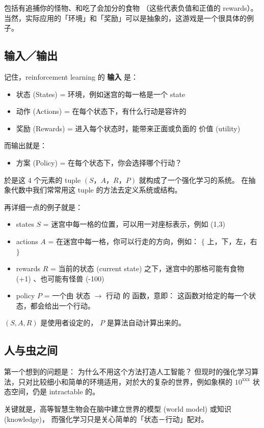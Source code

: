 \documentclass[orivec]{llncs}
\newcommand{\emp}[1]{\textbf{\textcolor{Cerulean}{#1}}}
\begin{document}
包括有追捕你的怪物、和吃了会加分的食物 （这些代表负值和正值的 rewards）。  当然，实际应用的「环境」和「奖励」可以是抽象的，这游戏是一个很具体的例子。

\subsection{输入／输出}

记住，reinforcement learning 的 \emp{输入} 是：
\let\labelitemi\labelitemii
\begin{itemize}
\item 状态 (States) = 环境，例如迷宫的每一格是一个 state
\item 动作 (Actions) = 在每个状态下，有什么行动是容许的
\item 奖励 (Rewards) = 进入每个状态时，能带来正面或负面的 价值 (utility)
\end{itemize}
而输出就是：
\begin{itemize}
\item 方案 (Policy) = 在每个状态下，你会选择哪个行动？
\end{itemize}
於是这 4 个元素的 tuple $(S，A，R，P)$ 就构成了一个强化学习的系统。   在抽象代数中我们常常用这 tuple 的方法去定义系统或结构。

再详细一点的例子就是：
\begin{itemize}
\item states $S$ = 迷宫中每一格的位置，可以用一对座标表示，例如 (1,3)
\item actions $A$ = 在迷宫中每一格，你可以行走的方向，例如： $\{$ 上，下，左，右 $\}$
\item rewards $R$ = 当前的状态 (current state) 之下，迷宫中的那格可能有食物 (+1) 、也可能有怪兽 (-100)
\item policy $P$ = 一个由 状态 $\rightarrow$ 行动 的 函数，意即： 这函数对给定的每一个状态，都会给出一个行动。 
\end{itemize}
$(S, A, R)$ 是使用者设定的， $P$ 是算法自动计算出来的。  

\subsection{人与虫之间}

第一个想到的问题是： 为什么不用这个方法打造人工智能？  但现时的强化学习算法，只对比较细小和简单的环境适用，对於大的复杂的世界，例如象棋的 $10^{\mbox{xxx}}$ 状态空间，仍是 intractable 的。

关键就是，高等智慧生物会在脑中建立世界的模型 (world model) 或知识 (knowledge)， 而强化学习只是关心简单的「状态－行动」配对。
\end{document}
